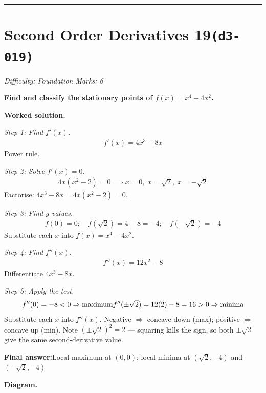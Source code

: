 \documentclass[11pt]{article}
\newcommand{\question}[1]{\par\medskip\noindent\textbf{#1}\par}
\begin{document}
\medskip\hrule

\section*{Second Order Derivatives 19\quad\small\texttt{(d3-019)}}
\textit{Difficulty: Foundation \quad\textbar\quad Marks: 6}

\question{Find and classify the stationary points of \( f(x) = x^4 - 4x^2 \).}

\textbf{Worked solution.}

\textit{Step 1: Find \( f'(x) \).}
\[\begin{gathered}
f'(x) = 4x^3 - 8x
\end{gathered}\]
Power rule.

\textit{Step 2: Solve \( f'(x) = 0 \).}
\[\begin{gathered}
4x(x^2 - 2) = 0 \implies x = 0,\; x = \sqrt{2},\; x = -\sqrt{2}
\end{gathered}\]
Factorise: \(4x^3 - 8x = 4x(x^2-2) = 0\).

\textit{Step 3: Find \( y \)-values.}
\[\begin{gathered}
f(0)=0; \quad f(\sqrt{2}) = 4 - 8 = -4; \quad f(-\sqrt{2}) = -4
\end{gathered}\]
Substitute each \( x \) into \( f(x) = x^4 - 4x^2 \).

\textit{Step 4: Find \( f''(x) \).}
\[\begin{gathered}
f''(x) = 12x^2 - 8
\end{gathered}\]
Differentiate \(4x^3 - 8x\).

\textit{Step 5: Apply the test.}
\[\begin{gathered}
f''(0) = -8 < 0 \Rightarrow \text{maximum} \newline f''(\pm\sqrt{2}) = 12(2) - 8 = 16 > 0 \Rightarrow \text{minima}
\end{gathered}\]
Substitute each \( x \) into \( f''(x) \). Negative \(\Rightarrow\) concave down (max); positive \(\Rightarrow\) concave up (min). Note \( (\pm\sqrt{2})^2 = 2 \) --- squaring kills the sign, so both \(\pm\sqrt{2}\) give the same second-derivative value.

\begin{answerbox}
\textbf{Final answer:}\quad Local maximum at \(\displaystyle  (0, 0) \); local minima at \(\displaystyle  (\sqrt{2}, -4) \) and \(\displaystyle  (-\sqrt{2}, -4) \)
\end{answerbox}
\textbf{Diagram.}
\end{document}
